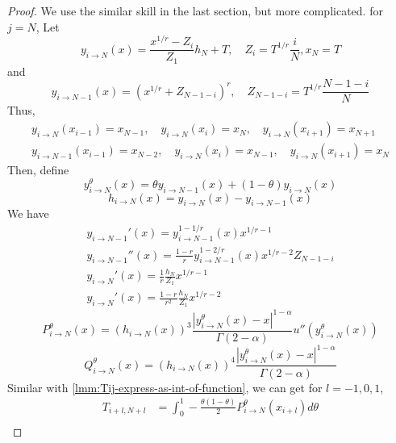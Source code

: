 \documentclass[review,supplement,hidelinks,onefignum,onetabnum]{siamart220329}
\begin{document}
\begin{proof}
  We use the similar skill in the last section, but more complicated.
  for \(j=N\),
  Let
  \begin{equation}
    y_{i\to N}(x) = \frac{x^{1/r} - Z_i}{Z_1} h_N + T, \quad Z_i = T^{1/r}\frac{i}{N}, x_N = T
  \end{equation}
  and
  \begin{equation}
    y_{i\to N-1}(x) = (x^{1/r} + Z_{N-1-i})^{r}, \quad Z_{N-1-i} = T^{1/r}\frac{N-1-i}{N}
  \end{equation}
  Thus,
  \begin{gather*}
    y_{i\to N}(x_{i-1}) = x_{N-1}, \quad  y_{i\to N}(x_{i}) = x_{N}, \quad y_{i\to N}(x_{i+1}) = x_{N+1} \\
    y_{i\to N-1}(x_{i-1}) = x_{N-2}, \quad  y_{i\to N}(x_{i}) = x_{N-1}, \quad y_{i\to N}(x_{i+1}) = x_{N}
  \end{gather*}
  Then, define
  \begin{equation}
    y_{i\to N}^\theta(x) = \theta y_{i\to N-1}(x) + (1-\theta) y_{i\to N}(x)
  \end{equation}
  \begin{equation}
    h_{i\to N}(x) = y_{i\to N}(x) - y_{i\to N-1}(x)
  \end{equation}
  We have
  \begin{gather}
    {y_{i\to N-1}}'(x) = y_{i\to N-1}^{1-1/r}(x) x^{1/r-1}  \\
    {y_{i\to N-1}}''(x) = \frac{1-r}{r} y_{i\to N-1}^{1-2/r}(x) x^{1/r-2} Z_{N-1-i}  \\
    {y_{i\to N}}'(x) = \frac{1}{r}\frac{h_N}{Z_1} x^{1/r-1}  \\
    {y_{i\to N}}'(x) = \frac{1-r}{r^2}\frac{h_N}{Z_1} x^{1/r-2}
  \end{gather}
  \begin{equation}
    P_{i\to N}^\theta(x) = (h_{i\to N}(x))^3 \frac{|y_{i\to N}^\theta(x)-x|^{1-\alpha}}{\Gamma(2-\alpha)} u''(y_{i\to N}^\theta(x)) 
  \end{equation}
  \begin{equation}
    Q_{i\to N}^\theta(x) = (h_{i\to N}(x))^4 \frac{|y_{i\to N}^\theta(x)-x|^{1-\alpha}}{\Gamma(2-\alpha)} 
  \end{equation}
  Similar with \cref{lmm:Tij-express-as-int-of-function}, we can get for \(l=-1,0,1\),
  \begin{equation}
    \begin{aligned}
      T_{i+l, N+l} & = \int_{0}^{1} -\frac{\theta (1-\theta)}{2} {P_{i\to N}^\theta}(x_{i+l}) d\theta                                                                                               \\

\end{aligned}
\end{equation}
\end{proof}
\end{document}
